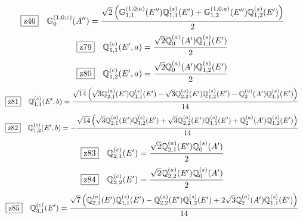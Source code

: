 \documentclass[fleqn,10pt,landscape]{jsarticle}
\begin{document}
\begin{dmath*}
\hspace*{3mm}\fbox{z46}\quad \mathbb{G}_{0}^{(1,0;c)}(A^{\prime\prime})=\frac{\sqrt{2} \left(\mathbb{G}_{1,1}^{(1,0;a)}(E^{\prime\prime}) \mathbb{Q}_{1,1}^{(s)}(E^{\prime}) + \mathbb{G}_{1,2}^{(1,0;a)}(E^{\prime\prime}) \mathbb{Q}_{1,2}^{(s)}(E^{\prime})\right)}{2}
\end{dmath*}
\begin{dmath*}
\hspace*{3mm}\fbox{z79}\quad \mathbb{Q}_{1,1}^{(c)}(E^{\prime},a)=\frac{\sqrt{2} \mathbb{Q}_{0}^{(a)}(A^{\prime}) \mathbb{Q}_{1,1}^{(s)}(E^{\prime})}{2}
\end{dmath*}
\begin{dmath*}
\hspace*{3mm}\fbox{z80}\quad \mathbb{Q}_{1,2}^{(c)}(E^{\prime},a)=\frac{\sqrt{2} \mathbb{Q}_{0}^{(a)}(A^{\prime}) \mathbb{Q}_{1,2}^{(s)}(E^{\prime})}{2}
\end{dmath*}
\begin{dmath*}
\hspace*{3mm}\fbox{z81}\quad \mathbb{Q}_{1,1}^{(c)}(E^{\prime},b)=\frac{\sqrt{14} \left(\sqrt{3} \mathbb{Q}_{2,1}^{(a)}(E^{\prime}) \mathbb{Q}_{1,1}^{(s)}(E^{\prime}) - \sqrt{3} \mathbb{Q}_{2,2}^{(a)}(E^{\prime}) \mathbb{Q}_{1,2}^{(s)}(E^{\prime}) - \mathbb{Q}_{2}^{(a)}(A^{\prime}) \mathbb{Q}_{1,1}^{(s)}(E^{\prime})\right)}{14}
\end{dmath*}
\begin{dmath*}
\hspace*{3mm}\fbox{z82}\quad \mathbb{Q}_{1,2}^{(c)}(E^{\prime},b)=- \frac{\sqrt{14} \left(\sqrt{3} \mathbb{Q}_{2,1}^{(a)}(E^{\prime}) \mathbb{Q}_{1,2}^{(s)}(E^{\prime}) + \sqrt{3} \mathbb{Q}_{2,2}^{(a)}(E^{\prime}) \mathbb{Q}_{1,1}^{(s)}(E^{\prime}) + \mathbb{Q}_{2}^{(a)}(A^{\prime}) \mathbb{Q}_{1,2}^{(s)}(E^{\prime})\right)}{14}
\end{dmath*}
\begin{dmath*}
\hspace*{3mm}\fbox{z83}\quad \mathbb{Q}_{2,1}^{(c)}(E^{\prime})=\frac{\sqrt{2} \mathbb{Q}_{2,1}^{(a)}(E^{\prime}) \mathbb{Q}_{0}^{(s)}(A^{\prime})}{2}
\end{dmath*}
\begin{dmath*}
\hspace*{3mm}\fbox{z84}\quad \mathbb{Q}_{2,2}^{(c)}(E^{\prime})=\frac{\sqrt{2} \mathbb{Q}_{2,2}^{(a)}(E^{\prime}) \mathbb{Q}_{0}^{(s)}(A^{\prime})}{2}
\end{dmath*}
\begin{dmath*}
\hspace*{3mm}\fbox{z85}\quad \mathbb{Q}_{3,1}^{(c)}(E^{\prime})=\frac{\sqrt{7} \left(\mathbb{Q}_{2,1}^{(a)}(E^{\prime}) \mathbb{Q}_{1,1}^{(s)}(E^{\prime}) - \mathbb{Q}_{2,2}^{(a)}(E^{\prime}) \mathbb{Q}_{1,2}^{(s)}(E^{\prime}) + 2 \sqrt{3} \mathbb{Q}_{2}^{(a)}(A^{\prime}) \mathbb{Q}_{1,1}^{(s)}(E^{\prime})\right)}{14}
\end{dmath*}
\end{document}
